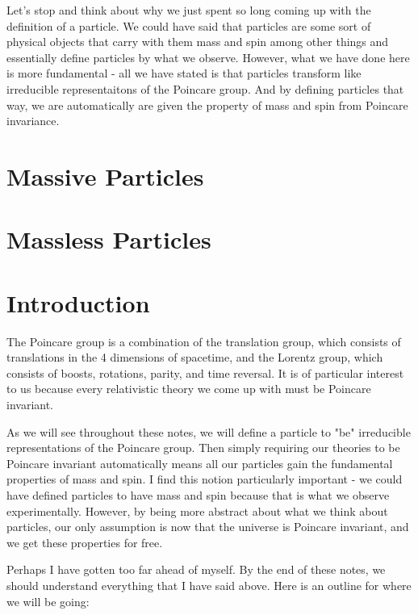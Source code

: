 \documentclass[12pt]{article}
\newcommand{\aside}[2]{#1}
\begin{document}
Let's stop and think about why we just spent so long coming up with the definition of a particle. We could have said that particles are some sort of physical objects that carry with them mass and spin among other things and essentially define particles by what we observe. However, what we have done here is more fundamental - all we have stated is that particles transform like irreducible representaitons of the Poincare group. And by defining particles that way, we are automatically are given the property of mass and spin from Poincare invariance.


\section{Massive Particles}
\section{Massless Particles}

\section{Introduction}
The Poincare group is a combination of the translation group, which consists of translations in the 4 dimensions of spacetime, and the Lorentz group, which consists of boosts, rotations, parity, and time reversal. It is of particular interest to us because \aside{every relativistic theory we come up with must be Poincare invariant}{Ignoring general relativity, in which Poincare invariance is only local.}.


As we will see throughout these notes, we will define a particle to "be" irreducible representations of the Poincare group. Then simply requiring our theories to be Poincare invariant automatically means all our particles gain the fundamental properties of mass and spin. I find this notion particularly important - we could have defined particles to have mass and spin because that is what we observe experimentally. However, by being more abstract about what we think about particles, our only assumption is now that the universe is Poincare invariant, and we get these properties for free.

Perhaps I have gotten too far ahead of myself. By the end of these notes, we should understand everything that I have said above. Here is an outline for where we will be going:
\end{document}
